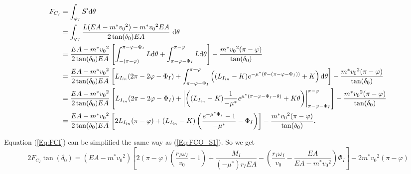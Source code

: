 \documentclass[a4paper,fleqn,13pt]{article}
\begin{document}
\begin{equation} \label{Eq:FCI}
 \begin{aligned}
  F_{C_I} & = \int_{\varphi_I} S^{\prime} \mathrm{d} \theta \\
          & = \int_{\varphi_I} \frac{L(EA-m^*{v_0}^2)-m^*{v_0}^2 EA}{2\tan(\delta_0)EA} \,\, \mathrm{d} \theta \\
          & = \frac{EA-m^*{v_0}^2}{2\tan(\delta_0)EA} \left[ \int_{-(\pi-\varphi)}^{\pi-\varphi-\Phi_I} L \mathrm{d} \theta + \int_{\pi-\varphi-\Phi_I}^{\pi-\varphi} L \mathrm{d} \theta \right] -\frac{m^*{v_0}^2(\pi-\varphi)}{\tan(\delta_0)} \\
          & = \frac{EA-m^*{v_0}^2}{2\tan(\delta_0)EA} \left[ L_{I_{in}}(2\pi-2\varphi-\Phi_I) + \int_{\pi-\varphi-\Phi_I}^{\pi-\varphi} \left((L_{I_{in}} -K) e^{-\mu^*(\theta-(\pi-\varphi-\Phi_I))} + K \right) \mathrm{d} \theta \right] - \frac{m^*{v_0}^2(\pi-\varphi)}{\tan(\delta_0)} \\
          & = \frac{EA-m^*{v_0}^2}{2\tan(\delta_0)EA} \left[ L_{I_{in}}(2\pi-2\varphi-\Phi_I) + \left|\left((L_{I_{in}} -K) \frac{1}{-\mu^*} e^{\mu^*(\pi-\varphi-\Phi_I-\theta)} + K \theta \right)\right|_{\pi-\varphi-\Phi_I}^{\pi-\varphi} \right]- \frac{m^*{v_0}^2(\pi-\varphi)}{\tan(\delta_0)} \\
          & = \frac{EA-m^*{v_0}^2}{2\tan(\delta_0)EA} \left[ 2L_{I_{in}}(\pi-\varphi) + (L_{I_{in}}-K)\left( \frac{e^{-\mu^*\Phi_I}-1}{-\mu^*} -\Phi_I\right) \right] - \frac{m^*{v_0}^2(\pi-\varphi)}{\tan(\delta_0)} .
 \end{aligned}
\end{equation}

Equation (\ref{Eq:FCI}) can be simplified the same way as (\ref{Eq:FCO_S1}). So we get
\begin{equation}  \label{Eq:FCI_S1}
  2F_{C_I} \tan (\delta_0)  = \left(EA-m^*{v_0}^2 \right)\left[2(\pi-\varphi) \left(\frac{r_I\omega_I}{v_0}-1 \right) + \frac{M_I}{(-\mu^*)r_IEA} - \left(\frac{r_I\omega_I}{v_0} - \frac{EA}{EA-m^*{v_0}^2}\right)\Phi_I\right]  - 2m^*{v_0}^2(\pi-\varphi)
\end{equation}
\end{document}
